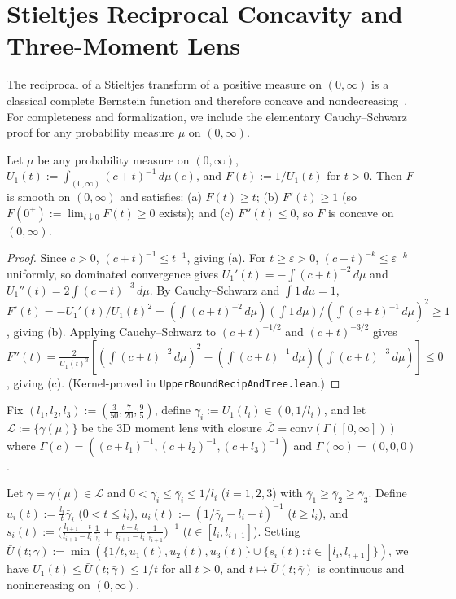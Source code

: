 \section{Stieltjes Reciprocal Concavity and Three-Moment Lens}\label{sec:ub-lens}

The reciprocal of a Stieltjes transform of a positive measure on $(0,\infty)$ is a classical complete Bernstein function and therefore concave and nondecreasing~\cite[Theorem~7.3]{SchillingSongVondracek12}. For completeness and formalization, we include the elementary Cauchy--Schwarz proof for any probability measure $\mu$ on $(0,\infty)$.

\begin{lemma}\label{lem:recip-conc}
Let $\mu$ be any probability measure on $(0,\infty)$, $U_1(t) := \int_{(0,\infty)} (c+t)^{-1}\,d\mu(c)$, and $F(t) := 1/U_1(t)$ for $t > 0$. Then $F$ is smooth on $(0,\infty)$ and satisfies: (a) $F(t) \ge t$; (b) $F'(t) \ge 1$ (so $F(0^+) := \lim_{t\downarrow 0} F(t) \ge 0$ exists); and (c) $F''(t) \le 0$, so $F$ is concave on $(0,\infty)$.
\end{lemma}

\begin{proof}
Since $c > 0$, $(c+t)^{-1} \le t^{-1}$, giving (a). For $t \ge \varepsilon > 0$, $(c+t)^{-k} \le \varepsilon^{-k}$ uniformly, so dominated convergence gives $U_1'(t) = -\int (c+t)^{-2}\,d\mu$ and $U_1''(t) = 2\int (c+t)^{-3}\,d\mu$. By Cauchy--Schwarz and $\int 1\,d\mu = 1$, $F'(t) = -U_1'(t)/U_1(t)^2 = (\int (c+t)^{-2}\,d\mu)(\int 1\,d\mu) / (\int (c+t)^{-1}\,d\mu)^2 \ge 1$, giving (b). Applying Cauchy--Schwarz to $(c+t)^{-1/2}$ and $(c+t)^{-3/2}$ gives $F''(t) = \frac{2}{U_1(t)^3}[(\int (c+t)^{-2}\,d\mu)^2 - (\int (c+t)^{-1}\,d\mu)(\int (c+t)^{-3}\,d\mu)] \le 0$, giving (c). (Kernel-proved in \texttt{UpperBoundRecipAndTree.lean}.)
\end{proof}

Fix $(l_1, l_2, l_3) := (\frac{3}{50}, \frac{7}{20}, \frac{9}{5})$, define $\gamma_i := U_1(l_i) \in (0, 1/l_i)$, and let $\mathcal{L} := \{\gamma(\mu)\}$ be the 3D moment lens with closure $\overline{\mathcal{L}} = \mathrm{conv}(\Gamma([0,\infty]))$ where $\Gamma(c) = ((c+l_1)^{-1},(c+l_2)^{-1},(c+l_3)^{-1})$ and $\Gamma(\infty) = (0,0,0)$.

\begin{corollary}\label{cor:ubar}
Let $\gamma = \gamma(\mu) \in \mathcal{L}$ and $0 < \gamma_i \le \bar{\gamma}_i \le 1/l_i$ ($i=1,2,3$) with $\bar{\gamma}_1 \ge \bar{\gamma}_2 \ge \bar{\gamma}_3$. Define $u_i(t) := \frac{l_i}{t}\bar{\gamma}_i$ ($0 < t \le l_i$), $u_i(t) := (1/\bar{\gamma}_i - l_i + t)^{-1}$ ($t \ge l_i$), and $s_i(t) := \bigl(\frac{l_{i+1}-t}{l_{i+1}-l_i}\frac{1}{\bar{\gamma}_i} + \frac{t-l_i}{l_{i+1}-l_i}\frac{1}{\bar{\gamma}_{i+1}}\bigr)^{-1}$ ($t \in [l_i, l_{i+1}]$). Setting $\bar{U}(t;\bar{\gamma}) := \min(\{1/t, u_1(t), u_2(t), u_3(t)\} \cup \{s_i(t) : t \in [l_i, l_{i+1}]\})$, we have $U_1(t) \le \bar{U}(t;\bar{\gamma}) \le 1/t$ for all $t > 0$, and $t \mapsto \bar{U}(t;\bar{\gamma})$ is continuous and nonincreasing on $(0,\infty)$.
\end{corollary}

